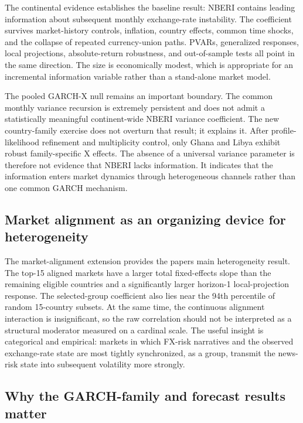 \documentclass[11pt]{article}
\begin{document}
The continental evidence establishes the baseline result: NBERI contains
leading information about subsequent monthly exchange-rate instability.
The coefficient survives market-history controls, inflation, country
effects, common time shocks, and the collapse of repeated currency-union
paths. PVARs, generalized responses, local projections, absolute-return
robustness, and out-of-sample tests all point in the same direction. The
size is economically modest, which is appropriate for an incremental
information variable rather than a stand-alone market model.

The pooled GARCH-X null remains an important boundary. The common
monthly variance recursion is extremely persistent and does not admit a
statistically meaningful continent-wide NBERI variance coefficient. The
new country-family exercise does not overturn that result; it explains
it. After profile-likelihood refinement and multiplicity control, only
Ghana and Libya exhibit robust family-specific X effects. The absence of
a universal variance parameter is therefore not evidence that NBERI
lacks information. It indicates that the information enters market
dynamics through heterogeneous channels rather than one common GARCH
mechanism.

\subsection{Market alignment as an organizing device for
heterogeneity}\label{market-alignment-as-an-organizing-device-for-heterogeneity}

The market-alignment extension provides the paper\textquotesingle s main
heterogeneity result. The top-15 aligned markets have a larger total
fixed-effects slope than the remaining eligible countries and a
significantly larger horizon-1 local-projection response. The
selected-group coefficient also lies near the 94th percentile of random
15-country subsets. At the same time, the continuous alignment
interaction is insignificant, so the raw correlation should not be
interpreted as a structural moderator measured on a cardinal scale. The
useful insight is categorical and empirical: markets in which FX-risk
narratives and the observed exchange-rate state are most tightly
synchronized, as a group, transmit the news-risk state into subsequent
volatility more strongly.

\subsection{Why the GARCH-family and forecast results
matter}\label{why-the-garch-family-and-forecast-results-matter}
\end{document}
